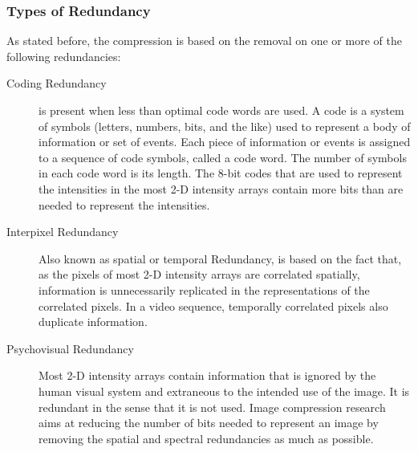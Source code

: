 \subsubsection{Types of Redundancy}
As stated before, the compression is based on the removal on one or more of the following redundancies:
\begin{description}
\item[Coding Redundancy] is present when less than optimal code words are used. A code is a system of symbols (letters, numbers, bits, and the like) used to represent a body of information or set of events. Each piece of information or events is assigned to a sequence of code symbols, called a code word. The number of symbols in each code word is its length. The 8-bit codes that are used to represent the intensities in the most 2-D intensity arrays contain more bits than are needed to represent the intensities.
\item[Interpixel Redundancy] Also known as spatial or temporal Redundancy, is based on the fact that, as the pixels of most 2-D intensity arrays are correlated spatially, information is unnecessarily replicated in the representations of the correlated pixels. In a video sequence, temporally correlated pixels also duplicate information.
\item[Psychovisual Redundancy] Most 2-D intensity arrays contain information that is ignored by the human visual system and extraneous to the intended use of the image. It is redundant in the sense that it is not used. Image compression research aims at reducing the number of bits needed to represent an image by removing the spatial and spectral redundancies as much as possible.
\end{description}

